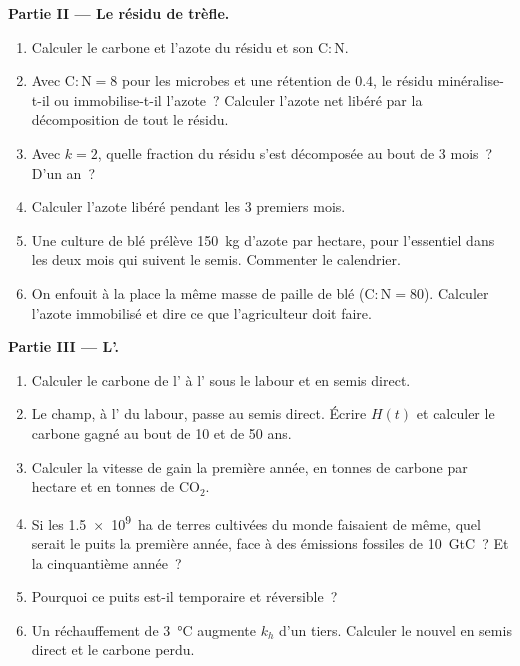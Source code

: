\begin{problem}
\medskip
\noindent\textbf{Partie II --- Le résidu de trèfle.}
\begin{enumerate}[resume]
  \item Calculer le carbone et l'azote du résidu et son
        $\mathrm{C:N}$.
  \item Avec $\mathrm{C:N} = 8$ pour les microbes et une rétention de $0.4$,
        le résidu minéralise-t-il ou immobilise-t-il l'azote~? Calculer
        l'azote net libéré par la décomposition de tout le résidu.
  \item Avec $k = 2$, quelle fraction du résidu s'est décomposée au bout
        de 3 mois~? D'un an~?
  \item Calculer l'azote libéré pendant les 3 premiers mois.
  \item Une culture de blé prélève \qty{150}{kg} d'azote par hectare,
        pour l'essentiel dans les deux mois qui suivent le semis.
        Commenter le calendrier.
  \item On enfouit à la place la même masse de paille de blé
        ($\mathrm{C:N} = 80$). Calculer l'azote immobilisé et dire ce que
        l'agriculteur doit faire.
\end{enumerate}

\medskip
\noindent\textbf{Partie III --- L'.}
\begin{enumerate}[resume]
  \item Calculer le carbone de l' à l' sous le
        labour et en semis direct.
  \item Le champ, à l' du labour, passe au semis direct.
        Écrire $H(t)$ et calculer le carbone gagné au bout de 10 et de
        50 ans.
  \item Calculer la vitesse de gain la première année, en tonnes de
        carbone par hectare et en tonnes de $\mathrm{CO_2}$.
  \item Si les \qty{1.5e9}{ha} de terres cultivées du monde faisaient de
        même, quel serait le puits la première année, face à des émissions
        fossiles de \qty{10}{GtC}~? Et la cinquantième année~?
  \item Pourquoi ce puits est-il temporaire et réversible~?
  \item Un réchauffement de \qty{3}{\celsius} augmente $k_h$ d'un tiers.
        Calculer le nouvel  en semis direct et le
        carbone perdu.
\end{enumerate}


\end{problem}
